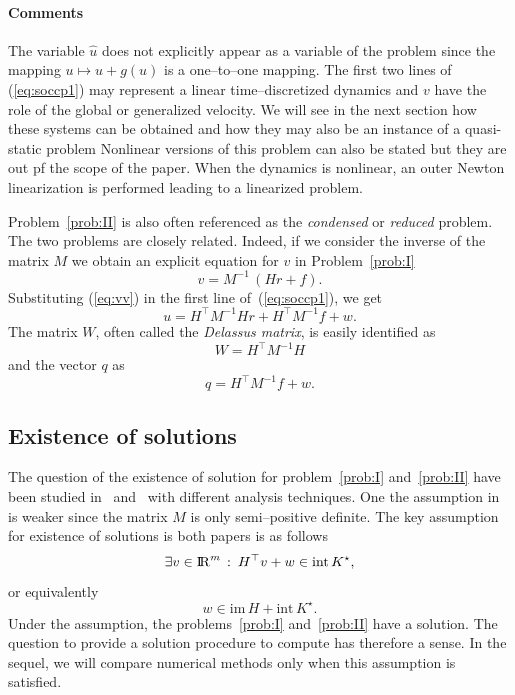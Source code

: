 \paragraph{Comments} The variable $\hat u$ does not explicitly appear as a variable of the problem since the mapping $u \mapsto u+g(u)$ is a one--to--one mapping.
The  first two lines of (\ref{eq:soccp1}) may represent a linear time--discretized dynamics and $v$ have the role of the global or generalized velocity. We will see in the next section how these systems can be  obtained and how they may also be an instance of a quasi-static problem
 Nonlinear versions of this problem can also be stated but they are out pf the scope of the paper. When the dynamics is nonlinear, an outer Newton linearization is performed leading to a linearized problem. 


Problem~\ref{prob:II} is also often referenced as the \textit{condensed} or \textit{reduced} problem. The two problems are closely related. Indeed, if we consider the inverse of the matrix $M$ we obtain an explicit equation for $v$ in Problem~\ref{prob:I}
\begin{equation}
  \label{eq:vv}
  v = M^{-1}\,(Hr +f).
\end{equation}
Substituting (\ref{eq:vv}) in the first line of~(\ref{eq:soccp1}), we get
\begin{equation}
  \label{eq:vv-1}
  u = H^\top M^{-1} H r + H^\top M^{-1} f +w.
\end{equation}
The matrix $W$, often called the \textit{Delassus matrix}, is easily identified as
\begin{equation}
  \label{eq:Delassus}
  W = H^\top M^{-1} H 
\end{equation}
and the vector $q$ as
\begin{equation}
  \label{eq:qq}
  q = H^\top M^{-1} f +w.
\end{equation}


\subsection{Existence of solutions}
\label{sec:existence}

The question of the existence of solution for problem~\ref{prob:I} and~\ref{prob:II} have been studied in~\cite{Klarbring.Pang1998} and~\cite{Acary.ea_ZAMM2011} with different analysis techniques. One the assumption in~\cite{Klarbring.Pang1998} is weaker since the matrix $M$ is only semi--positive definite. The key assumption for existence of solutions is both papers is as follows
\begin{equation}\label{ass}
   \exists v\in \RR^m \,:\: H^\top v + w \in \mathrm{int}\, K^\star,
\end{equation}
or equivalently
\begin{equation}\label{asseq}
  w\in\mathrm{im}\, H + \mathrm{int}\, K^\star.
\end{equation}
Under the assumption, the problems~\ref{prob:I} and~\ref{prob:II} have a solution. The question to provide a solution procedure to compute has therefore a sense. In the sequel, we will compare numerical methods only when this assumption is satisfied.

